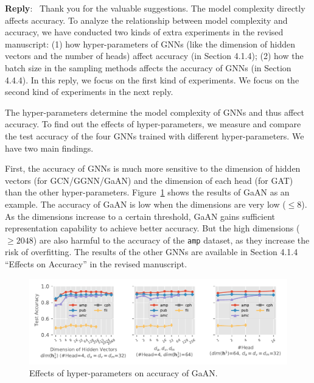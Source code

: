 \documentclass[12pt]{article}
\newenvironment{reply}
   {\medskip \noindent \textbf{Reply}:\  }
   {\medskip}
\begin{document}
\begin{reply}
    Thank you for the valuable suggestions.
    The model complexity directly affects accuracy.
    To analyze the relationship between model complexity and accuracy, we have conducted two kinds of extra experiments in the revised manuscript: (1) how hyper-parameters of GNNs (like the dimension of hidden vectors and the number of heads) affect accuracy (in Section 4.1.4); (2) how the batch size in the sampling methods affects the accuracy of GNNs (in Section 4.4.4).
    In this reply, we focus on the first kind of experiments.
    We focus on the second kind of experiments in the next reply.
    
    The hyper-parameters determine the model complexity of GNNs and thus affect accuracy.
    To find out the effects of hyper-parameters, we measure and compare the test accuracy of the four GNNs trained with different hyper-parameters.
    We have two main findings.
    
    First, the accuracy of GNNs is much more sensitive to the dimension of hidden vectors (for GCN/GGNN/GaAN) and the dimension of each head (for GAT) than the other hyper-parameters.
    Figure~\ref{fig:effect_of_hyper_parameter_on_accuracy_of_gaan} shows the results of GaAN as an example.
    The accuracy of GaAN is low when the dimensions are very low ($\leq 8$).
    As the dimensions increase to a certain threshold, GaAN gains sufficient representation capability to achieve better accuracy.
    But the high dimensions ($\geq 2048$) are also harmful to the accuracy of the \texttt{amp} dataset, as they increase the risk of overfitting.
    The results of the other GNNs are available in Section 4.1.4 ``Effects on Accuracy'' in the revised manuscript.
   
    
    \begin{figure}[h]
        \includegraphics[width=1.0\columnwidth]{../figs/experiments/exp_hyperparameter_on_accuracy_gaan.pdf}
        \caption{Effects of hyper-parameters on accuracy of GaAN.}
        \label{fig:effect_of_hyper_parameter_on_accuracy_of_gaan}
   

\end{figure}
\end{reply}
\end{document}
